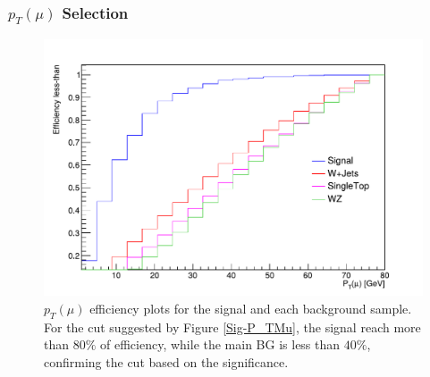 \documentclass{beamer}
\begin{document}
\begin{frame}
\frametitle{$p_T(\mu)$ Selection}
\begin{figure}[!h]

\centering
\includegraphics[scale=0.4]{pictures/Selection/P_TMu/Eff-P_TMu}
\caption{{\scriptsize$p_T(\mu)$ efficiency plots for the signal and each background sample. For the cut suggested by Figure \ref{Sig-P_TMu}, the signal reach more than $80\%$ of efficiency, while the main BG is less than $40\%$, confirming the cut based on the significance.}}
\label{Eff-P_TMu}

\end{figure}


\end{frame}

\end{document}
